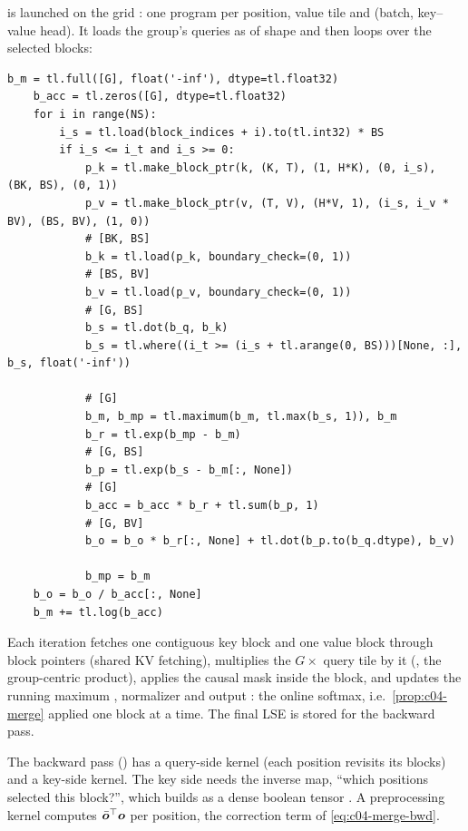 \begin{implnote}[title={In the code: the selection kernel}]
 is launched on the grid : one program per
position, value tile and (batch, key--value head). It loads the group's queries as
 of shape \code{[G, BK]} and then loops over the selected blocks:
\begin{lstlisting}[caption={Excerpt from \texttt{repos/\allowbreak{}fla-org\_\_native-sparse-attention/\allowbreak{}native\_sparse\_attention/\allowbreak{}ops/\allowbreak{}parallel.py}},label={lst:c04-nsa-kernel}]
    b_m = tl.full([G], float('-inf'), dtype=tl.float32)
    b_acc = tl.zeros([G], dtype=tl.float32)
    for i in range(NS):
        i_s = tl.load(block_indices + i).to(tl.int32) * BS
        if i_s <= i_t and i_s >= 0:
            p_k = tl.make_block_ptr(k, (K, T), (1, H*K), (0, i_s), (BK, BS), (0, 1))
            p_v = tl.make_block_ptr(v, (T, V), (H*V, 1), (i_s, i_v * BV), (BS, BV), (1, 0))
            # [BK, BS]
            b_k = tl.load(p_k, boundary_check=(0, 1))
            # [BS, BV]
            b_v = tl.load(p_v, boundary_check=(0, 1))
            # [G, BS]
            b_s = tl.dot(b_q, b_k)
            b_s = tl.where((i_t >= (i_s + tl.arange(0, BS)))[None, :], b_s, float('-inf'))

            # [G]
            b_m, b_mp = tl.maximum(b_m, tl.max(b_s, 1)), b_m
            b_r = tl.exp(b_mp - b_m)
            # [G, BS]
            b_p = tl.exp(b_s - b_m[:, None])
            # [G]
            b_acc = b_acc * b_r + tl.sum(b_p, 1)
            # [G, BV]
            b_o = b_o * b_r[:, None] + tl.dot(b_p.to(b_q.dtype), b_v)

            b_mp = b_m
    b_o = b_o / b_acc[:, None]
    b_m += tl.log(b_acc)
\end{lstlisting}
Each iteration fetches one contiguous key block and one value block through block pointers
(shared KV fetching), multiplies the $G\times$ query tile by it (, the
group-centric product), applies the causal mask inside the block, and updates the running
maximum , normalizer  and output : the online softmax, i.e.\
\cref{prop:c04-merge} applied one block at a time. The final LSE is stored for the backward pass.

The backward pass () has a query-side kernel (each position revisits its
blocks) and a key-side kernel. The key side needs the inverse map, ``which positions selected
this block?'', which \code{parallel_nsa_kernel_mask} builds as a dense boolean tensor
\code{[B, T, H, NS]}. A preprocessing kernel computes $\bar{\bm{o}}^{\top}\bm{o}$ per position, the
correction term of \eqref{eq:c04-merge-bwd}.
\end{implnote}

